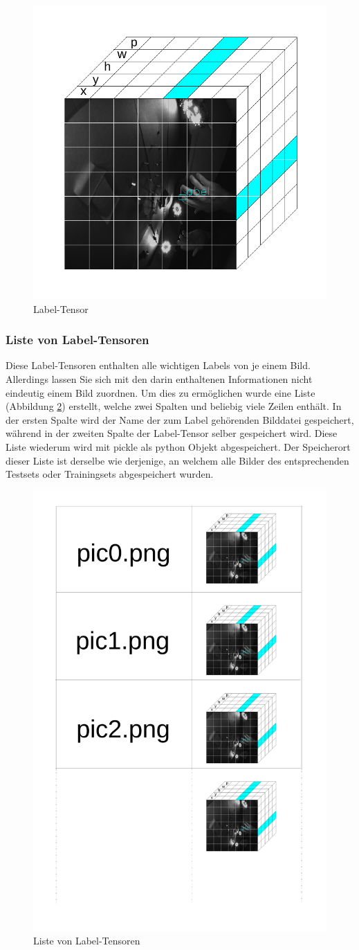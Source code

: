 \begin{figure}	
	\centering
	\includegraphics[width=.7\textwidth]{Kapitel/30DatenPipeline/Bilder/LabelTensor.pdf}
	\caption{Label-Tensor}
	\label{img:label_tensor}
\end{figure} 

\subsubsection{Liste von Label-Tensoren}
Diese Label-Tensoren enthalten alle wichtigen Labels von je einem Bild. 
Allerdings lassen Sie sich mit den darin enthaltenen Informationen nicht eindeutig einem Bild zuordnen. 
Um dies zu ermöglichen wurde eine Liste (Abbildung \ref{img:label_list}) erstellt, welche zwei Spalten und beliebig viele Zeilen enthält.
In der ersten Spalte wird der Name der zum Label gehörenden Bilddatei gespeichert, während in der zweiten Spalte der Label-Tensor selber gespeichert wird. 
Diese Liste wiederum wird mit pickle als python Objekt abgespeichert.
Der Speicherort dieser Liste ist derselbe wie derjenige, an welchem alle Bilder des entsprechenden Testsets oder Trainingsets abgespeichert wurden.

\begin{figure}	
	\centering
	\includegraphics[width=.4\textwidth]{Kapitel/30DatenPipeline/Bilder/LabelList.pdf}
	\caption{Liste von Label-Tensoren}
	\label{img:label_list}
\end{figure} 

